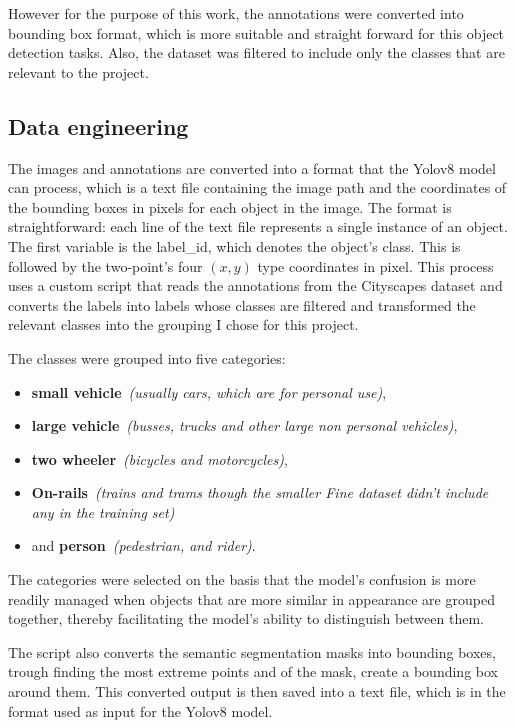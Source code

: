 However for the purpose of this work, the annotations were converted into bounding box format,
which is more suitable and straight forward for this object detection tasks.
Also, the dataset was filtered to include only the classes that are relevant to the project.

\subsection{Data engineering} \label{subsec:data-management}
The images and annotations are converted into a format that the Yolov8 model can process, which is
a text file containing the image path and the coordinates of the bounding boxes in pixels for each object in the image.
The format is straightforward: each line of the text file represents a single instance of an object.
The first variable is the label\_id, which denotes the object's class.
This is followed by the two-point's four \((x, y)\) type coordinates in pixel.
This process uses a custom script that reads the annotations from the Cityscapes dataset and converts the labels
into labels whose classes are filtered and transformed the relevant classes into the grouping I chose for this project.

The classes were grouped into five categories:
\begin{itemize}
    \item \textbf{small vehicle}~\textit{(usually cars, which are for personal use)},
    \item \textbf{large vehicle}~\textit{(busses, trucks and other large non personal vehicles)},
    \item \textbf{two wheeler}~\textit{(bicycles and motorcycles)},
    \item \textbf{On-rails}~\textit{(trains and trams though the smaller Fine dataset didn't include any in the training set)}
    \item and \textbf{person}~\textit{(pedestrian, and rider)}.
\end{itemize}

The categories were selected on the basis that the model's confusion is more readily managed when objects
that are more similar in appearance are grouped together, thereby facilitating the model's ability to
distinguish between them.

The script also converts the semantic segmentation masks into bounding boxes, trough finding the most
extreme points and of the mask, create a bounding box around them.
This converted output is then saved into a text file, which is in the format used as input for the Yolov8 model.

